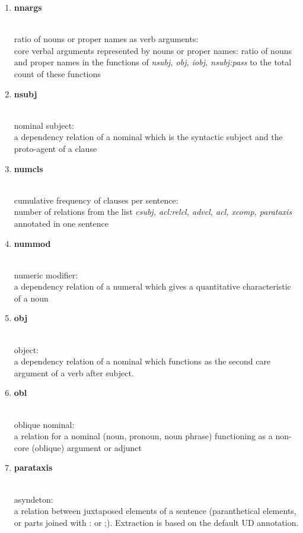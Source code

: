 \begin{enumerate}
	\item \hypertarget{ft:nnargs}{\textbf{nnargs}} \\
		ratio of nouns or proper names as verb arguments: \\
		core verbal arguments represented by nouns or proper names: ratio of nouns and proper names in the functions of \textit{nsubj, obj, iobj, nsubj:pass} to the total count of these functions
	
	\item \hypertarget{ft:nsubj}{\textbf{nsubj}} \\
		nominal subject: \\
		a dependency relation of a nominal which is the syntactic subject and the proto-agent of a clause
	
	\item \hypertarget{ft:numcls}{\textbf{numcls}} \\
		cumulative frequency of clauses per sentence: \\
		number of relations from the list \textit{csubj, acl:relcl, advcl, acl, xcomp, parataxis} annotated in one sentence
		
	\item \hypertarget{ft:nummod}{\textbf{nummod}} \\
		numeric modifier: \\
		a dependency relation of a numeral which gives a quantitative characteristic of a noun
	
	\item \hypertarget{ft:obj}{\textbf{obj}} \\
		object: \\
		a dependency relation of a nominal which functions as the second care argument of a verb after subject.
	
	\item \hypertarget{ft:obl}{\textbf{obl}} \\
		oblique nominal: \\
		a relation for a nominal (noun, pronoun, noun phrase) functioning as a non-core (oblique) argument or adjunct
	
	\item \hypertarget{ft:parataxis}{\textbf{parataxis}} \\
		asyndeton: \\
		a relation between juxtaposed elements of a sentence (paranthetical elements, or parts joined with : or ;). Extraction is based on the default UD annotation.
	

\end{enumerate}
